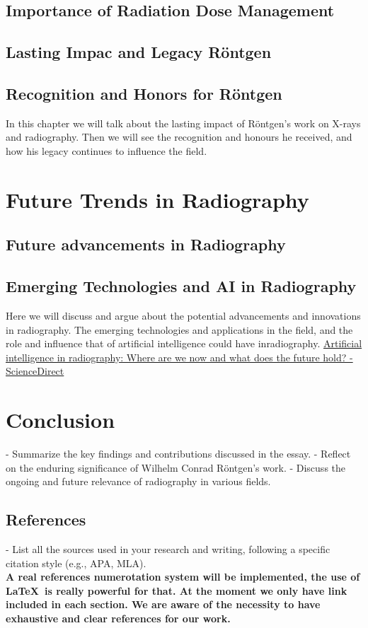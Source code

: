 \documentclass[a4paper,12pt]{report}
\begin{document}
\section{Importance of Radiation Dose Management}
\section{Lasting Impac and Legacy Röntgen}
\section{Recognition and Honors for Röntgen}
In this chapter we will talk about the lasting impact of Röntgen's work on X-rays and radiography. Then we will see the recognition and honours he received, and how his legacy continues to influence the field.

\chapter{Future Trends in Radiography}
\section{Future advancements in Radiography}
\section{Emerging Technologies and AI in Radiography}
Here we will discuss and argue about the potential advancements and innovations in radiography. The emerging technologies and applications in the field, and the role and influence that of artificial intelligence could have inradiography.
\href{https://www.sciencedirect.com/science/article/abs/pii/S107881742100095X}{Artificial intelligence in radiography: Where are we now and what does the future hold? - ScienceDirect }
\chapter{Conclusion}

- Summarize the key findings and contributions discussed in the essay.
- Reflect on the enduring significance of Wilhelm Conrad Röntgen's work.
- Discuss the ongoing and future relevance of radiography in various fields.

\newpage
\section*{\Huge{References}}
- List all the sources used in your research and writing, following a specific citation style (e.g., APA, MLA).\\[1ex]
\textbf{A real references numerotation system will be implemented, the use of  \LaTeX\ is really powerful for that. At the moment we only have link included in each section. We are aware of the necessity to have exhaustive and clear references for our work. }\\[1ex]
\end{document}
